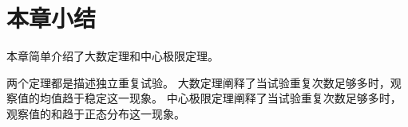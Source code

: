 \section{本章小结}

本章简单介绍了大数定理和中心极限定理。

两个定理都是描述独立重复试验。
大数定理阐释了当试验重复次数足够多时，观察值的均值趋于稳定这一现象。
中心极限定理阐释了当试验重复次数足够多时，观察值的和趋于正态分布这一现象。




